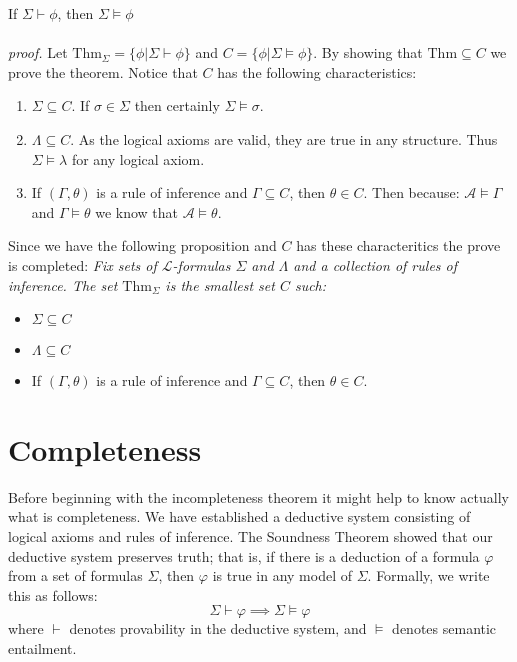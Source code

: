 \documentclass[10pt,a4paper]{article}
\newcounter{theo}
\newcommand{\curveL}{\mathcal{L}}
\newcommand{\curveA}{\mathcal{A}}
\newcommand{\thm}{\text{Thm}}
\begin{document}
                    \begin{theorem}
                        If $\Sigma\vdash\phi$, then $\Sigma\vDash\phi$
                        \\
                        \\
                        \textit{proof.} Let $\thm_\Sigma = \{\phi | \Sigma \vdash\phi\}$ and $C =\{\phi | \Sigma \vDash \phi\}$. By showing that $\thm\subseteq C$ we prove the theorem. Notice that $C$ has the following characteristics:
                        \begin{enumerate}
                            \item $\Sigma \subseteq C$. If $\sigma\in\Sigma$ then certainly $\Sigma\vDash\sigma$.
                            \item $\Lambda\subseteq C$. As the logical axioms are valid, they are true in any structure. Thus $\Sigma\vDash\lambda$ for any logical axiom.
                            \item If $(\Gamma,\theta)$ is a rule of inference and $\Gamma\subseteq C$, then $\theta\in C$. Then because: $\curveA\vDash\Gamma$ and $\Gamma\vDash\theta$ we know that $\curveA\vDash\theta$.
                        \end{enumerate}
                        Since we have the following proposition and $C$ has these characteritics the prove is completed:
                        \textit{Fix sets of $\curveL$-formulas $\Sigma$ and $\Lambda$ and a collection of rules of inference. The set $\thm_\Sigma$ is the smallest set $C$ such:}
                        \begin{itemize}
                            \item $\Sigma\subseteq C$
                            \item $\Lambda\subseteq C$ 
                            \item If $(\Gamma,\theta)$ is a rule of inference and $\Gamma\subseteq C$, then $\theta\in C$.
                        \end{itemize}
                    \end{theorem}
            \section{Completeness}
                Before beginning with the incompleteness theorem it might help to know actually what is completeness. We have established a deductive system consisting of logical axioms and rules of inference. The Soundness Theorem showed that our deductive system preserves truth; that is, if there is a deduction of a formula $\varphi$ from a set of formulas $\Sigma$, then $\varphi$ is true in any model of $\Sigma$. Formally, we write this as follows:
                $$\Sigma \vdash \varphi \implies \Sigma \models \varphi$$
                where $\vdash$ denotes provability in the deductive system, and $\models$ denotes semantic entailment.
                
\end{document}

